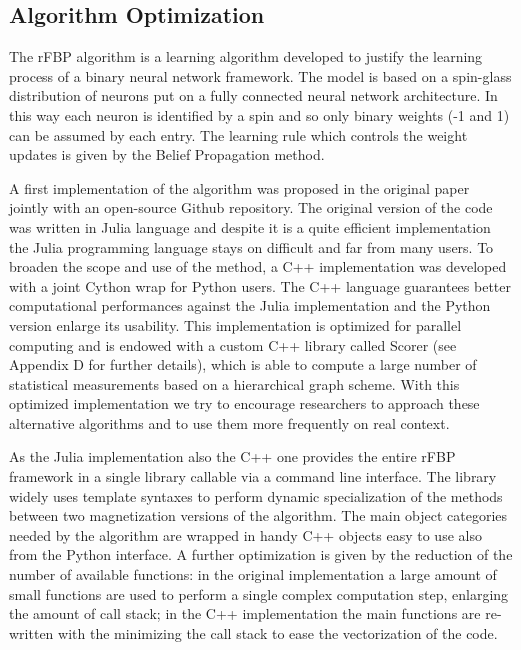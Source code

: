 \documentclass{standalone}
\begin{document}
\subsection[Algorithm Optimization]{Algorithm Optimization}\label{rfbp:rFBP}

The rFBP algorithm is a learning algorithm developed to justify the learning process of a binary neural network framework.
The model is based on a spin-glass distribution of neurons put on a fully connected neural network architecture.
In this way each neuron is identified by a spin and so only binary weights (-1 and 1) can be assumed by each entry.
The learning rule which controls the weight updates is given by the Belief Propagation method.

A first implementation of the algorithm was proposed in the original paper~\cite{BaldassiE7655} jointly with an open-source Github repository.
The original version of the code was written in \textsf{Julia} language and despite it is a quite efficient implementation the \textsf{Julia} programming language stays on difficult and far from many users.
To broaden the scope and use of the method, a \textsf{C++} implementation was developed with a joint \textsf{Cython} wrap for \textsf{Python} users.
The \textsf{C++} language guarantees better computational performances against the \textsf{Julia} implementation and the \textsf{Python} version enlarge its usability.
This implementation is optimized for parallel computing and is endowed with a custom \textsf{C++} library called \textsf{Scorer} (see Appendix D for further details), which is able to compute a large number of statistical measurements based on a hierarchical graph scheme.
With this optimized implementation we try to encourage researchers to approach these alternative algorithms and to use them more frequently on real context.

As the \textsf{Julia} implementation also the \textsf{C++} one provides the entire rFBP framework in a single library callable via a command line interface.
The library widely uses template syntaxes to perform dynamic specialization of the methods between two magnetization versions of the algorithm.
The main object categories needed by the algorithm are wrapped in handy \textsf{C++} objects easy to use also from the \textsf{Python} interface.
A further optimization is given by the reduction of the number of available functions: in the original implementation a large amount of small functions are used to perform a single complex computation step, enlarging the amount of call stack; in the \textsf{C++} implementation the main functions are re-written with the minimizing the call stack to ease the vectorization of the code.
\end{document}

